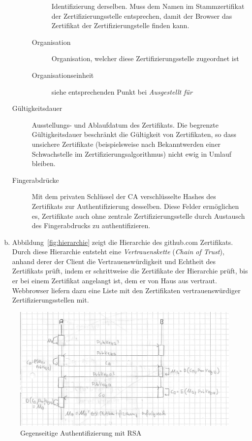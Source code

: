 \documentclass[11pt,a4paper]{scrartcl}
\begin{document}
\begin{enumerate}[a)]
\begin{description}
\begin{description}
      Identifizierung derselben.  Muss dem Namen im Stammzertifikat der
      Zertifizierungsstelle entsprechen, damit der Browser das Zertifikat der
      Zertifizierungstelle finden kann.
    \item[Organisation] Organisation, welcher diese Zertifizierungsstelle
      zugeordnet ist
    \item[Organisationseinheit] siehe entsprechenden Punkt bei
      \emph{Ausgestellt für}
    \end{description}
  \item[Gültigkeitsdauer] Ausstellungs- und Ablaufdatum des Zertifikats.  Die
    begrenzte Gültigkeitsdauer beschränkt die Gültigkeit von Zertifikaten, so
    dass unsichere Zertifikate (beispielsweise nach Bekanntwerden einer
    Schwachstelle im Zertifizierungsalgorithmus) nicht ewig in Umlauf bleiben.
  \item[Fingerabdrücke] Mit dem privaten Schlüssel der CA verschlüsselte Hashes
    des Zertifikats zur Authentifizierung desselben.  Diese Felder ermöglichen
    es, Zertifikate auch ohne zentrale Zertifizierungsstelle durch Austausch
    des Fingerabdrucks zu authentifizieren.
  \end{description}
\item Abbildung~\ref{fig:hierarchie} zeigt die Hierarchie des github.com
  Zertifikats.  Durch diese Hierarchie entsteht eine \emph{Vertrauenskette}
  (\emph{Chain of Trust}), anhand derer der Client die Vertrauenswürdigkeit und
  Echtheit des Zertifikats prüft, indem er schrittweise die Zertifikate der
  Hierarchie prüft, bis er bei einem Zertifikat angelangt ist, dem er von Haus
  aus vertraut.  Webbrowser liefern dazu eine Liste mit den Zertifikaten
  vertrauenswürdiger Zertifizierungsstellen mit.
\end{enumerate}

\begin{figure}[h]
  \centering
  \includegraphics[width=\textwidth]{authentifizierung.png}
  \caption{Gegenseitige Authentifizierung mit RSA}
  \label{fig:authentifizierung}
\end{figure}
\end{document}
